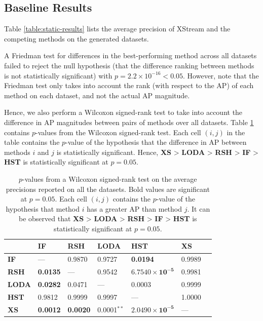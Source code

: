 \subsection{Baseline Results}

Table \ref{table:static-results} lists the average precision of XStream and the competing methods on the generated datasets.

A Friedman test for differences in the best-performing method across all datasets failed to reject the null hypothesis (that the difference ranking between methods is not statistically significant) with $p=2.2\times10^{-16} < 0.05$. However, note that the Friedman test only takes into account the rank (with respect to the AP) of each method on each dataset, and not the actual AP magnitude.

Hence, we also perform a Wilcoxon signed-rank test to take into account the difference in AP magnitudes between pairs of methods over all datasets. Table \ref{table:wilcoxon-all} contains $p$-values from the Wilcoxon signed-rank test. Each cell $(i,j)$ in the table contains the $p$-value of the hypothesis that the difference in AP between methods $i$ and $j$ is statistically significant. Hence, \textbf{XS} > \textbf{LODA} > \textbf{RSH} > \textbf{IF} > \textbf{HST} is statistically significant at $p=0.05$.
\begin{table}[h!]
		\centering
    \begin{tabular}{lllllll}
    \toprule
    ~        & \textbf{IF}   & \textbf{RSH}    & \textbf{LODA}      & \textbf{HST}  & \textbf{XS} \\
		\midrule
    \textbf{IF}  	 & ---       			& 0.9870    		& 0.9727   			& \textbf{0.0194}   						& 0.9989       \\
    \textbf{RSH}   & \textbf{0.0135} 	& ---       		& 0.9542   			& $\pmb{6.7540\times10^{-5}}$ & 0.9981       \\
    \textbf{LODA}  & \textbf{0.0282} 	& 0.0471    		& ---      			& 0.0003   							& 0.9999      \\
    \textbf{HST} 	 & 0.9812    			& 0.9999    		& 0.9997   			& ---         					& 1.0000       \\
    \textbf{XS}    & \textbf{0.0012} & \textbf{0.0020} & 0.0001$^{**}$ & $\pmb{2.0490\times10^{-5}}$  & ---       \\
		\bottomrule
    \end{tabular}
    \caption{$p$-values from a Wilcoxon signed-rank test on the average precisions reported on all the datasets. Bold values are significant at $p=0.05$. Each cell $(i,j)$ contains the $p$-value of the hypothesis that method $i$ has a greater AP than method $j$. It can be observed that \textbf{XS} > \textbf{LODA} > \textbf{RSH} > \textbf{IF} > \textbf{HST} is statistically significant at $p=0.05$.}
		\label{table:wilcoxon-all}
\end{table}

